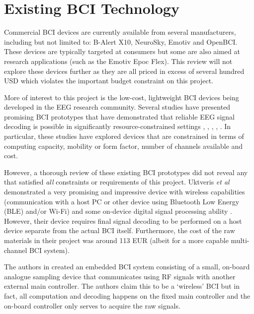 
\section{Existing BCI Technology}
\label{section:existing-bci-tech-c2}
Commercial BCI devices are currently available from several manufacturers, including but not limited to: B-Alert X10, NeuroSky, Emotiv and OpenBCI. These devices are typically targeted at consumers but some are also aimed at research applications (such as the Emotiv Epoc Flex). This review will not explore these devices further as they are all priced in excess of several hundred USD which violates the important budget constraint on this project.

More of interest to this project is the low-cost, lightweight BCI devices being developed in the EEG research community. Several studies have presented promising BCI prototypes that have demonstrated that reliable EEG signal decoding is possible in significantly resource-constrained settings \cite{uktveris-modular-bci}, \cite{de-vos-p300-speller}, \cite{liao-gaming-control}, \cite{chai-embedded-bci}, \cite{acampora-svm-clf}. In particular, these studies have explored devices that are constrained in terms of computing capacity, mobility or form factor, number of channels available and cost. 

However, a thorough review of these existing BCI prototypes did not reveal any that satisfied \textit{all} constraints or requirements of this project. Uktveris \textit{et al} demonstrated a very promising and impressive device with wireless capabilities (communication with a host PC or other device using Bluetooth Low Energy (BLE) and/or Wi-Fi) and some on-device digital signal processing ability \cite{uktveris-modular-bci}. However, their device requires final signal decoding to be performed on a host device separate from the actual BCI itself. Furthermore, the cost of the raw materials in their project was around 113 EUR \cite{uktveris-modular-bci} (albeit for a more capable multi-channel BCI system).

The authors in \cite{chai-embedded-bci} created an embedded BCI system consisting of a small, on-board analogue sampling device that communicates using RF signals with another external main controller. The authors claim this to be a `wireless' BCI but in fact, all computation and decoding happens on the fixed main controller and the on-board controller only serves to acquire the raw signals. 

